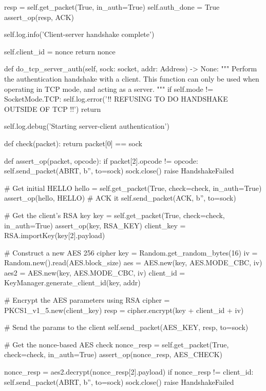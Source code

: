 \begin{pythoncode}
        resp = self.get_packet(True, in_auth=True)
        self.auth_done = True
        assert_op(resp, ACK)

        self.log.info('Client-server handshake complete')

        self.client_id = nonce
        return nonce

    def do_tcp_server_auth(self, sock: socket, addr: Address) -> None:
        """
        Perform the authentication handshake with a client.
        This function can only be used when operating in TCP mode, and acting
        as a server.
        """
        if self.mode != SocketMode.TCP:
            self.log.error('!! REFUSING TO DO HANDSHAKE OUTSIDE OF TCP !!')
            return

        self.log.debug('Starting server-client authentication')

        def check(packet):
            return packet[0] == sock

        def assert_op(packet, opcode):
            if packet[2].opcode != opcode:
                self.send_packet(ABRT, b'', to=sock)
                sock.close()
                raise HandshakeFailed

        # Get initial HELLO
        hello = self.get_packet(True, check=check, in_auth=True)
        assert_op(hello, HELLO)
        # ACK it
        self.send_packet(ACK, b'', to=sock)

        # Get the client's RSA key
        key = self.get_packet(True, check=check, in_auth=True)
        assert_op(key, RSA_KEY)
        client_key = RSA.importKey(key[2].payload)

        # Construct a new AES 256 cipher
        key = Random.get_random_bytes(16)
        iv = Random.new().read(AES.block_size)
        aes = AES.new(key, AES.MODE_CBC, iv)
        aes2 = AES.new(key, AES.MODE_CBC, iv)
        client_id = KeyManager.generate_client_id(key, addr)

        # Encrypt the AES parameters using RSA
        cipher = PKCS1_v1_5.new(client_key)
        resp = cipher.encrypt(key + client_id + iv)

        # Send the params to the client
        self.send_packet(AES_KEY, resp, to=sock)

        # Get the nonce-based AES check
        nonce_resp = self.get_packet(True, check=check, in_auth=True)
        assert_op(nonce_resp, AES_CHECK)

        nonce_resp = aes2.decrypt(nonce_resp[2].payload)
        if nonce_resp != client_id:
            self.send_packet(ABRT, b'', to=sock)
            sock.close()
            raise HandshakeFailed


\end{pythoncode}
